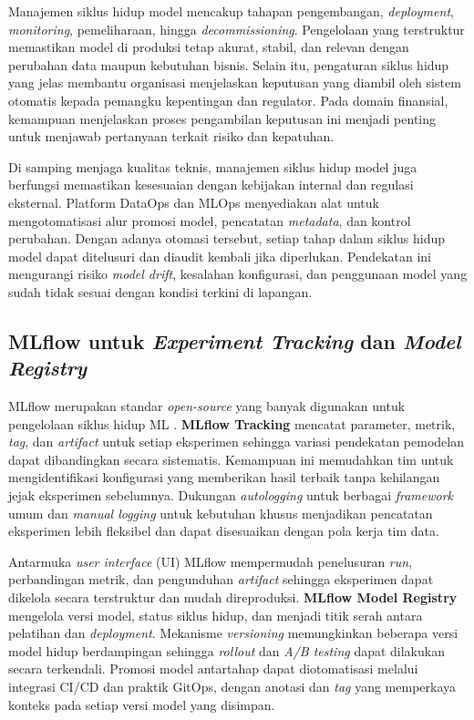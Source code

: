 Manajemen siklus hidup model mencakup tahapan pengembangan, \textit{deployment}, \textit{monitoring}, pemeliharaan, hingga \textit{decommissioning}. Pengelolaan yang terstruktur memastikan model di produksi tetap akurat, stabil, dan relevan dengan perubahan data maupun kebutuhan bisnis. Selain itu, pengaturan siklus hidup yang jelas membantu organisasi menjelaskan keputusan yang diambil oleh sistem otomatis kepada pemangku kepentingan dan regulator. Pada domain finansial, kemampuan menjelaskan proses pengambilan keputusan ini menjadi penting untuk menjawab pertanyaan terkait risiko dan kepatuhan.

Di samping menjaga kualitas teknis, manajemen siklus hidup model juga berfungsi memastikan kesesuaian dengan kebijakan internal dan regulasi eksternal. Platform DataOps dan MLOps menyediakan alat untuk mengotomatisasi alur promosi model, pencatatan \textit{metadata}, dan kontrol perubahan. Dengan adanya otomasi tersebut, setiap tahap dalam siklus hidup model dapat ditelusuri dan diaudit kembali jika diperlukan. Pendekatan ini mengurangi risiko \textit{model drift}, kesalahan konfigurasi, dan penggunaan model yang sudah tidak sesuai dengan kondisi terkini di lapangan.

\subsection{MLflow untuk \textit{Experiment Tracking} dan \textit{Model Registry}}
\label{sec:mlflow}

MLflow merupakan standar \textit{open-source} yang banyak digunakan untuk pengelolaan siklus hidup ML \autocite{mlflow2024}. \textbf{MLflow Tracking} mencatat parameter, metrik, \textit{tag}, dan \textit{artifact} untuk setiap eksperimen sehingga variasi pendekatan pemodelan dapat dibandingkan secara sistematis. Kemampuan ini memudahkan tim untuk mengidentifikasi konfigurasi yang memberikan hasil terbaik tanpa kehilangan jejak eksperimen sebelumnya. Dukungan \textit{autologging} untuk berbagai \textit{framework} umum dan \textit{manual logging} untuk kebutuhan khusus menjadikan pencatatan eksperimen lebih fleksibel dan dapat disesuaikan dengan pola kerja tim data.

Antarmuka \textit{user interface} (UI) MLflow mempermudah penelusuran \textit{run}, perbandingan metrik, dan pengunduhan \textit{artifact} sehingga eksperimen dapat dikelola secara terstruktur dan mudah direproduksi. \textbf{MLflow Model Registry} mengelola versi model, status siklus hidup, dan menjadi titik serah antara pelatihan dan \textit{deployment}. Mekanisme \textit{versioning} memungkinkan beberapa versi model hidup berdampingan sehingga \textit{rollout} dan \textit{A/B testing} dapat dilakukan secara terkendali. Promosi model antartahap dapat diotomatisasi melalui integrasi CI/CD dan praktik GitOps, dengan anotasi dan \textit{tag} yang memperkaya konteks pada setiap versi model yang disimpan.

